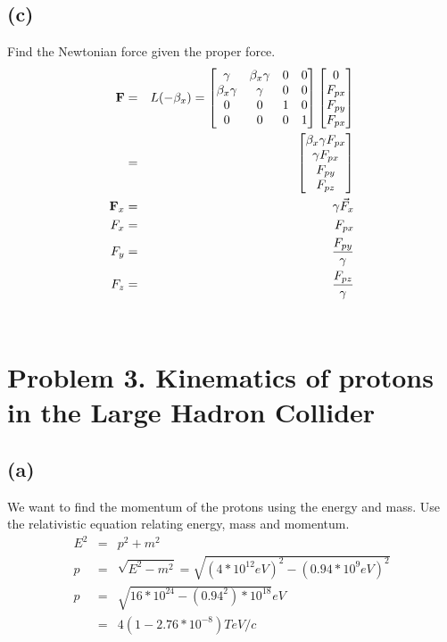 \documentclass[11pt]{amsart}
\begin{document}
\subsection*{(c)}  Find the Newtonian force given the proper force. \\
\begin{eqnarray*}
\bold{F} &=& L(-\beta_{x}) = \begin{bmatrix}
	\gamma & \beta_{x}\gamma & 0 & 0 \\
	\beta_{x}\gamma & \gamma & 0 & 0 \\
	0 & 0 & 1 & 0 \\
	0 & 0 & 0 & 1
	\end{bmatrix}\begin{bmatrix}
	0 \\
	F_{px} \\
	F_{py} \\
	F_{px} 
	\end{bmatrix} \\
&=& \begin{bmatrix}
	\beta_{x}\gamma{F_{px}} \\
	\gamma{F_{px}} \\
	F_{py} \\
	F_{pz} 
	\end{bmatrix} \\
\bold{F}_{x} &=& \gamma\vec{F}_{x} \\
F_{x} &=& F_{px} \\
F_{y} &=& \frac{F_{py}}{\gamma} \\
F_{z} &=& \frac{F_{pz}}{\gamma} 
\end{eqnarray*} \\

\section*{Problem 3. Kinematics of protons in the Large Hadron Collider}

\subsection*{(a)} We want to find the momentum of the protons using the energy and mass. Use the relativistic equation relating energy, mass and momentum. \\
\begin{eqnarray*}
E^{2} &=& p^{2}+m^{2} \\
p &=& \sqrt{E^{2}-m^{2}} = \sqrt{(4*10^{12}eV)^{2}-(0.94*10^{9}eV)^{2}} \\
p &=& \sqrt{16*10^{24}-(0.94^{2})*10^{18}}eV \\
&=&  4(1-2.76*10^{-8})TeV/c 
\end{eqnarray*} \\
\end{document}
